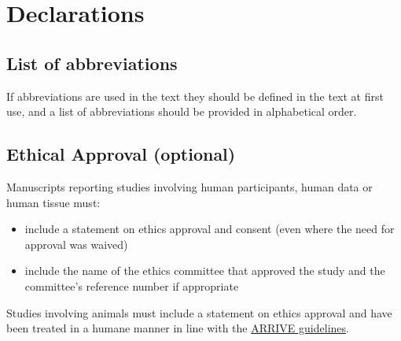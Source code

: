 \documentclass[a4paper,num-refs]{oup-contemporary}
\begin{document}




\section{Declarations}

\subsection{List of abbreviations}
If abbreviations are used in the text they should be defined in the text at first use, and a list of abbreviations should be provided in alphabetical order.

\subsection{Ethical Approval (optional)}
Manuscripts reporting studies involving human participants, human data or human tissue must:

\begin{itemize}
\item include a statement on ethics approval and consent (even where the need for approval was waived)
\item include the name of the ethics committee that approved the study and the committee's reference number if appropriate
\end{itemize}

Studies involving animals must include a statement on ethics approval and have been treated in a humane manner in line with the \href{http://www.nc3rs.org.uk/arrive-guidelines}{ARRIVE guidelines}.
\end{document}
